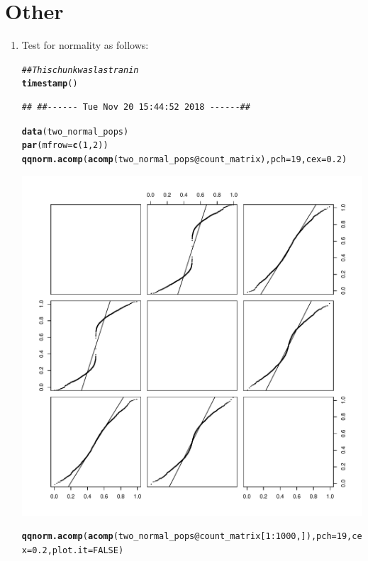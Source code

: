 \documentclass{article}\usepackage[]{graphicx}\usepackage[]{color}
\makeatletter
\def\maxwidth{ %
  \ifdim\Gin@nat@width>\linewidth
    \linewidth
  \else
    \Gin@nat@width
  \fi
}
\newcommand{\hlnum}[1]{\textcolor[rgb]{0.686,0.059,0.569}{#1}}%
\newcommand{\hlcom}[1]{\textcolor[rgb]{0.678,0.584,0.686}{\textit{#1}}}%
\newcommand{\hlopt}[1]{\textcolor[rgb]{0,0,0}{#1}}%
\newcommand{\hlstd}[1]{\textcolor[rgb]{0.345,0.345,0.345}{#1}}%
\newcommand{\hlkwc}[1]{\textcolor[rgb]{0.333,0.667,0.333}{#1}}%
\newcommand{\hlkwd}[1]{\textcolor[rgb]{0.737,0.353,0.396}{\textbf{#1}}}%
\newenvironment{kframe}{%
 \def\at@end@of@kframe{}%
 \ifinner\ifhmode%
  \def\at@end@of@kframe{\end{minipage}}%
  \begin{minipage}{\columnwidth}%
 \fi\fi%
 \def\FrameCommand##1{\hskip\@totalleftmargin \hskip-\fboxsep
 \colorbox{shadecolor}{##1}\hskip-\fboxsep
     \hskip-\linewidth \hskip-\@totalleftmargin \hskip\columnwidth}%
 \MakeFramed {\advance\hsize-\width
   \@totalleftmargin\z@ \linewidth\hsize
   \@setminipage}}%
 {\par\unskip\endMakeFramed%
 \at@end@of@kframe}
\newenvironment{knitrout}{}{} %
\makeatother
\begin{document}
\section{Other}
\begin{enumerate}
\item Test for normality as follows:
\begin{knitrout}
\color{fgcolor}\begin{kframe}
\begin{alltt}
\hlcom{## This chunk was last ran in}
\hlkwd{timestamp}\hlstd{()}
\end{alltt}
\begin{verbatim}
## ##------ Tue Nov 20 15:44:52 2018 ------##
\end{verbatim}
\begin{alltt}
\hlkwd{data}\hlstd{(two_normal_pops)}
\hlkwd{par}\hlstd{(}\hlkwc{mfrow}\hlstd{=}\hlkwd{c}\hlstd{(}\hlnum{1}\hlstd{,}\hlnum{2}\hlstd{))}
\hlkwd{qqnorm.acomp}\hlstd{(}\hlkwd{acomp}\hlstd{(two_normal_pops}\hlopt{@}\hlkwc{count_matrix}\hlstd{),} \hlkwc{pch}\hlstd{=}\hlnum{19}\hlstd{,} \hlkwc{cex}\hlstd{=}\hlnum{0.2}\hlstd{)}
\end{alltt}
\end{kframe}
\includegraphics[width=\maxwidth]{figure/unnamed-chunk-8-1} 
\begin{kframe}\begin{alltt}
\hlkwd{qqnorm.acomp}\hlstd{(}\hlkwd{acomp}\hlstd{(two_normal_pops}\hlopt{@}\hlkwc{count_matrix}\hlstd{[}\hlnum{1}\hlopt{:}\hlnum{1000}\hlstd{,]),} \hlkwc{pch}\hlstd{=}\hlnum{19}\hlstd{,} \hlkwc{cex}\hlstd{=}\hlnum{0.2}\hlstd{,} \hlkwc{plot.it}\hlstd{=}\hlnum{FALSE}\hlstd{)}
\end{alltt}



\end{kframe}
\end{knitrout}
\end{enumerate}
\end{document}
